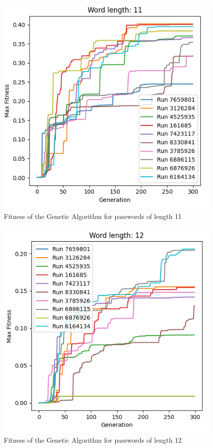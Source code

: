 \documentclass[sigconf,authordraft]{acmart}
\begin{document}
\begin{figure}
  \includegraphics[width=\columnwidth]{genetic_results_11.png}
  \caption{Fitness of the Genetic Algorithm for passwords of length 11}
  \label{fig:fitness_genetic_11}
\end{figure}

\begin{figure}
  \includegraphics[width=\columnwidth]{genetic_results_12.png}
  \caption{Fitness of the Genetic Algorithm for passwords of length 12}
  \label{fig:fitness_genetic_12}
\end{figure}
\end{document}

